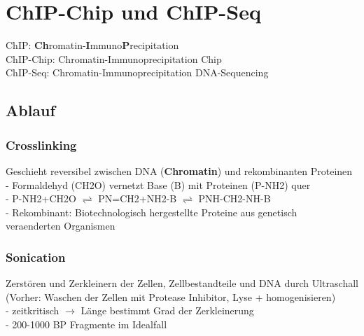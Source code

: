\section{ChIP-Chip und ChIP-Seq}
ChIP: \textbf{Ch}romatin-\textbf{I}mmuno\textbf{P}recipitation\\
ChIP-Chip: Chromatin-Immunoprecipitation Chip\\
ChIP-Seq: Chromatin-Immunoprecipitation DNA-Sequencing

\subsection{Ablauf}
\subsubsection{Crosslinking}
Geschieht reversibel zwischen DNA (\textbf{Chromatin}) und rekombinanten Proteinen\\
\hspace*{10mm}- Formaldehyd (CH2O) vernetzt Base (B) mit Proteinen (P-NH2) quer\\
\hspace*{10mm}- P-NH2+CH2O $\rightleftharpoons$ PN=CH2+NH2-B $\rightleftharpoons$ PNH-CH2-NH-B\\
\hspace*{10mm}- Rekombinant: Biotechnologisch hergestellte Proteine aus genetisch\\
\hspace*{10mm}veraenderten Organismen\\

\subsubsection{Sonication}
Zerstören und Zerkleinern der Zellen, Zellbestandteile und DNA durch Ultraschall\\
(Vorher: Waschen der Zellen mit Protease Inhibitor, Lyse + homogenisieren)\\
\hspace*{10mm}- zeitkritisch $\rightarrow$ Länge bestimmt Grad der Zerkleinerung\\
\hspace*{10mm}- 200-1000 BP Fragmente im Idealfall\\

